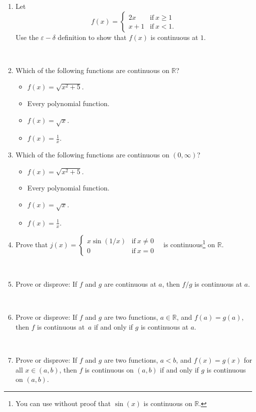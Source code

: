 \documentclass[12pt]{amsart}
\newcommand{\R}{\mathbb{R}}
\newcommand{\e}{\varepsilon}
\newcommand{\ds}{\displaystyle}
\begin{document}
\begin{enumerate}
\item Let \[f(x) = \begin{cases} 2x &\text{if} \ x\geq 1 \\ x+1 &\text{if} \ x<1. \end{cases}\]
 Use the $\e-\delta$ definition to show that $f(x)$ is continuous at $1$.
 
\

 \item Which of the following functions are continuous on $\R$?
\begin{multicols}{2} 
\begin{itemize}
 \item $f(x)=\sqrt{ x^2 +5}$.
 \item Every polynomial function.
  \item $f(x) = \sqrt{x}$.
  \item $f(x)=\ds\frac{1}{x}$.
 \end{itemize}
 \end{multicols}
 

 

 
 \item Which of the following functions are continuous on $(0,\infty)$?
 \begin{multicols}{2} 
 \begin{itemize}
 \item $f(x)=\sqrt{ x^2 +5}$.
 \item Every polynomial function.
  \item $f(x) = \sqrt{x}$.
  \item $f(x)=\ds\frac{1}{x}$.
 \end{itemize}
 \end{multicols}
 
 
 
 \item Prove that $j(x) =\begin{cases} x \sin(1/x) & \text{if} \ x\neq 0 \\ 0 & \text{if} \ x= 0\end{cases}$\ \ is continuous\footnote{You can use without proof that $\sin(x)$ is continuous on $\R$.} on $\R$.
 
 \
 
 \item Prove or disprove: If $f$ and $g$ are continuous at $a$, then $f/g$ is continuous at $a$.
 
 \
 
 \item Prove or disprove: If $f$ and $g$ are two functions, $a\in \R$, and  $f(a)=g(a)$, then $f$ is continuous at~$a$ if and only if $g$ is continuous at $a$.
 
 \

 
 \item Prove or disprove: If $f$ and $g$ are two functions, $a<b$, and  $f(x)=g(x)$ for all $x\in (a,b)$, then $f$ is continuous on $(a,b)$ if and only if $g$ is continuous on $(a,b)$.
   \end{enumerate}
   
   
\end{document}
